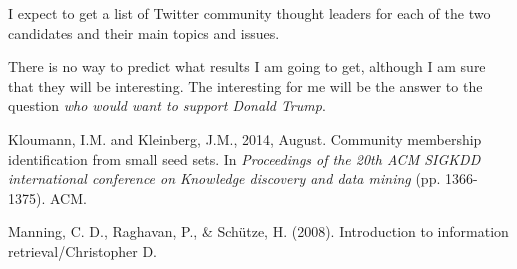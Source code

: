 \documentclass{sig-alternate-05-2015}
\begin{document}
I expect to get a list of Twitter community thought leaders for each of the two candidates and their main topics and issues.

There is no way to predict what results I am going to get, although I am sure that they will be interesting. The interesting for me will be the answer to the question \emph{who would want to support Donald Trump}. 

\begin{thebibliography}{1}

Kloumann, I.M. and Kleinberg, J.M., 2014, August. Community membership identification from small seed sets. In \emph{Proceedings of the 20th ACM SIGKDD international conference on Knowledge discovery and data mining} (pp. 1366-1375). ACM.

Manning, C. D., Raghavan, P., \& Sch\"utze, H. (2008). Introduction to information retrieval/Christopher D.

\end{thebibliography}
%
%
%
%

\end{document}
